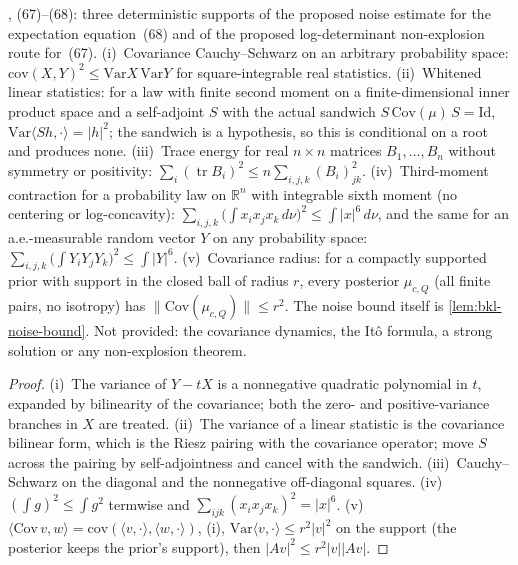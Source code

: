 \begin{lemma}
  \label{lem:bkl-localization-supports}
  \leanok
  \cite{BizeulKlartagLehec2026}, (67)--(68): three deterministic supports of the proposed noise estimate for
  the expectation equation~(68) and of the proposed log-determinant non-explosion route for~(67).
  (i)~Covariance Cauchy--Schwarz on an arbitrary probability space: $\mathrm{cov}(X,Y)^2\le\mathrm{Var}X\,\mathrm{Var}Y$
  for square-integrable real statistics.  (ii)~Whitened linear statistics: for a law with finite second moment
  on a finite-dimensional inner product space and a self-adjoint $S$ with the actual sandwich
  $S\,\mathrm{Cov}(\mu)\,S=\mathrm{Id}$, $\mathrm{Var}\langle Sh,\cdot\rangle=|h|^2$; the sandwich is a hypothesis,
  so this is conditional on a root and produces none.  (iii)~Trace energy for real $n\times n$ matrices
  $B_1,\dots,B_n$ without symmetry or positivity: $\sum_i(\operatorname{tr}B_i)^2\le n\sum_{i,j,k}(B_i)_{jk}^2$.
  (iv)~Third-moment contraction for a probability law on $\mathbb R^n$ with integrable sixth moment (no centering
  or log-concavity): $\sum_{i,j,k}\big(\int x_ix_jx_k\,d\nu\big)^2\le\int|x|^6\,d\nu$, and the same for an
  a.e.-measurable random vector $Y$ on any probability space: $\sum_{i,j,k}\big(\int Y_iY_jY_k\big)^2\le\int|Y|^6$.  (v)~Covariance radius: for a
  compactly supported prior with support in the closed ball of radius $r$, every posterior $\mu_{c,Q}$ (all finite
  pairs, no isotropy) has $\|\mathrm{Cov}(\mu_{c,Q})\|\le r^2$.
  The noise bound itself is \cref{lem:bkl-noise-bound}.  Not provided: the covariance dynamics, the It\^o formula, a strong solution or any non-explosion theorem.
\end{lemma}
\begin{proof}
  \leanok
  (i)~The variance of $Y-tX$ is a nonnegative quadratic polynomial in $t$, expanded by bilinearity of the
  covariance; both the zero- and positive-variance branches in $X$ are treated.  (ii)~The variance of a linear
  statistic is the covariance bilinear form, which is the Riesz pairing with the covariance operator; move $S$
  across the pairing by self-adjointness and cancel with the sandwich.  (iii)~Cauchy--Schwarz on the diagonal
  and the nonnegative off-diagonal squares.  (iv)~$(\int g)^2\le\int g^2$ termwise and
  $\sum_{ijk}(x_ix_jx_k)^2=|x|^6$.  (v)~$\langle\mathrm{Cov}\,v,w\rangle=\mathrm{cov}(\langle v,\cdot\rangle,
  \langle w,\cdot\rangle)$, (i), $\mathrm{Var}\langle v,\cdot\rangle\le r^2|v|^2$ on the support (the posterior
  keeps the prior's support), then $|Av|^2\le r^2|v||Av|$.
\end{proof}

